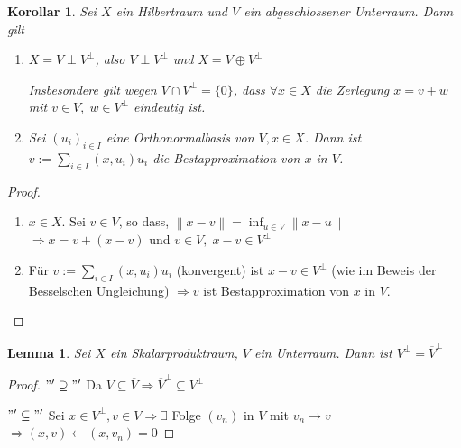 \documentclass[ngerman]{report}
\theoremstyle{plain}%
\newtheorem{lemma}[thm]{Lemma}
\newtheorem{cor}[thm]{Korollar}
\theoremstyle{definition}%
\theoremstyle{myStyle}
\newcommand{\norm}[1]{\left \|#1\right\| }
\newcommand{\df}[1][]{%
	\overset{#1}{\Rightarrow}
}
\newcommand{\ff}[3]{(#1_#2)_{#2\in#3}}
\begin{document}
	\begin{cor}
		Sei $X$ ein Hilbertraum und $V$ ein abgeschlossener Unterraum. Dann gilt 
			\begin{enumerate}
				\item $X = V \perp V^\perp$, also $ V\perp V^\perp$ und $X = V \oplus V^\perp$\par
				Insbesondere gilt wegen $V\cap V^\perp = \{0\}$, dass $\forall x\in X$ die Zerlegung $x = v + w$ mit $v\in V,\;w\in V^\perp$ eindeutig ist.
				\item Sei $\ff{u}{i}{I}$ eine Orthonormalbasis von $V, x\in X$. Dann ist 
				$v := \sum_{i\in I} (x,u_i) u_i$ die Bestapproximation von $x$ in $V$.
			\end{enumerate}
	\end{cor}
	\begin{proof}
		\begin{enumerate}
			\item $x\in X$. Sei $v\in V$, so dass, $\norm{x-v} = \inf_{u\in V}\norm{x-u}$
			$\df x = v + (x-v)$ und $v\in V,\;x-v \in V^\perp$
			\item Für $v := \sum_{i\in I} (x, u_i) u_i$ (konvergent) ist $x -v \in V^\perp$
			(wie im Beweis der Besselschen Ungleichung)
			$\df v$ ist Bestapproximation von $x$ in $V$.
		\end{enumerate}
	\end{proof}

	\begin{lemma}
		Sei $X$ ein Skalarproduktraum, $V$ ein Unterraum. Dann ist $V^\perp = \overline{V}^\perp$
	\end{lemma}
	\begin{proof}
		$"'\supseteq"'$  Da $V\subseteq \overline{V} \df \overline{V}^\perp \subseteq V^\perp$ \par
		$"'\subseteq"'$ Sei $x\in V^\perp, v\in V \df \exists$ Folge $(v_n)$ in $V$ mit $v_n \to v$
		$\df (x,v) \leftarrow (x,v_n) = 0$
	\end{proof}
\end{document}

